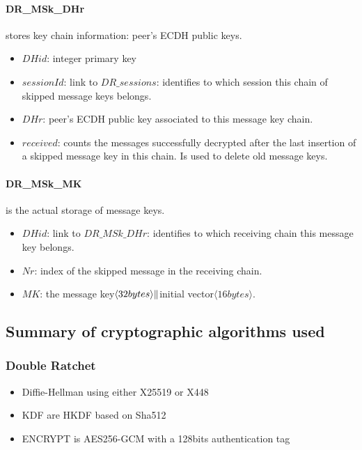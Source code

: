 \documentclass[a4paper,11pt]{article}
\begin{document}
    \paragraph*{DR\_MSk\_DHr} stores key chain information: peer's ECDH public keys.
    \begin{itemize}
      \item $DHid$: integer primary key
      \item $sessionId$: link to $DR\_sessions$: identifies to which session this chain of skipped message keys belongs.
      \item $DHr$: peer's ECDH public key associated to this message key chain.
      \item $received$: counts the messages successfully decrypted after the last insertion of a skipped message key in this chain. Is used to delete old message keys.
    \end{itemize}

    \paragraph*{DR\_MSk\_MK} is the actual storage of message keys.
    \begin{itemize}
      \item $DHid$: link to $DR\_MSk\_DHr$: identifies to which receiving chain this message key belongs.
      \item $Nr$: index of the skipped message in the receiving chain.
      \item $MK$: the message key$\langle 32bytes\rangle  \Arrowvert $initial vector$\langle 16bytes\rangle $.
    \end{itemize}
  

    
  \subsection{Summary of cryptographic algorithms used}
    \subsubsection{Double Ratchet}
      \begin{itemize}
        \item Diffie-Hellman using either X25519 or X448
        \item KDF are HKDF\cite{rfc5869} based on Sha512
        \item ENCRYPT is AES256-GCM with a 128bits authentication tag
      \end{itemize}
\end{document}
